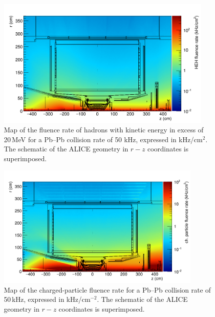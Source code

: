 \begin{figure}[!ht]
\begin{center}
\includegraphics[width=0.95\textwidth]{figures/SensorSimulation/hadron2.png}	
\end{center}
\caption{Map of the fluence rate of hadrons with kinetic energy in excess of 20\,MeV for a Pb--Pb collision rate of 50 kHz, expressed in kHz/cm$^{2}$. The schematic of the ALICE geometry in $r-z$ coordinates is superimposed.}
\label{had} 
\end{figure}

\begin{figure}[H]
\begin{center}
\includegraphics[width=0.9\textwidth]{figures/SensorSimulation/charged2.png}	
\end{center}
\caption{Map of the charged-particle fluence rate for a Pb--Pb collision rate of 50\,kHz, expressed in kHz/cm$^{-2}$. The schematic of the ALICE geometry in $r-z$ coordinates is superimposed.}
\label{ch} 
\end{figure}


